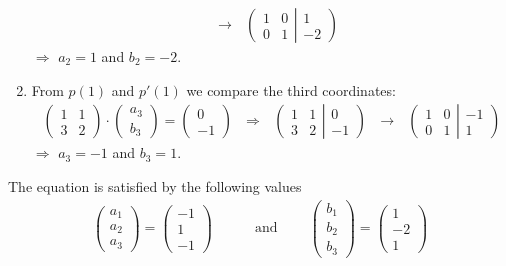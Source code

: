\documentclass{article}
\begin{document}
\begin{enumerate}
\begin{align}
                    \ \ \ \rightarrow\ \ \  \left(\begin{array}{cc} 1&0\\0&1 \end{array} \right | \left. \begin{array}{c} 1\\-2 \end{array}\right)
                \end{align}
                $\Rightarrow$ $a_2 = 1$ and $b_2 = -2$.
            \item From $p(1)$ and $p'(1)$ we compare the third coordinates:
                \begin{align}
                    \left(\begin{matrix} 1&1\\3&2 \end{matrix}\right) \cdot \left(\begin{matrix} a_3\\b_3 \end{matrix}\right) = \left(\begin{matrix} 0\\-1 \end{matrix}\right)
                    \ \ \ \Rightarrow\ \ \  \left(\begin{array}{cc} 1&1\\3&2 \end{array} \right | \left. \begin{array}{c} 0\\-1 \end{array}\right)
                    \ \ \ \rightarrow\ \ \  \left(\begin{array}{cc} 1&0\\0&1 \end{array} \right | \left. \begin{array}{c} -1\\1 \end{array}\right)
                \end{align}
                $\Rightarrow$ $a_3 = -1$ and $b_3 = 1$.
        \end{enumerate}
        The equation is satisfied by the following values
        \begin{align}
            \left(\begin{matrix} a_1\\a_2\\a_3 \end{matrix}\right) = \left(\begin{matrix} -1\\1\\-1 \end{matrix}\right)
            \ \ \ \ \ \ \ \ \ \ &\text{and}\ \ \ \ \ \ \ \ \ \ 
            \left(\begin{matrix} b_1\\b_2\\b_3 \end{matrix}\right) = \left(\begin{matrix} 1\\-2\\1 \end{matrix}\right)
        \end{align}
\end{document}
